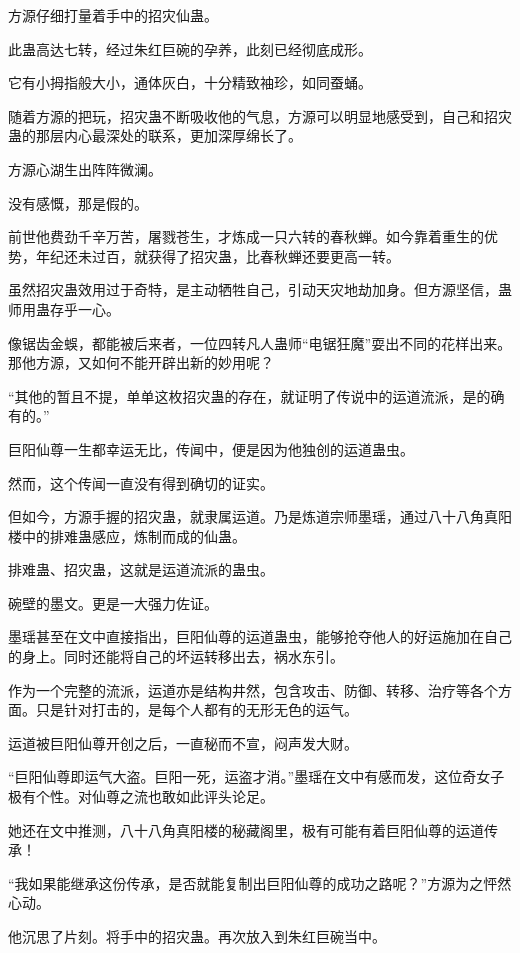 
\begin{this_body}

方源仔细打量着手中的招灾仙蛊。

此蛊高达七转，经过朱红巨碗的孕养，此刻已经彻底成形。

它有小拇指般大小，通体灰白，十分精致袖珍，如同蚕蛹。

随着方源的把玩，招灾蛊不断吸收他的气息，方源可以明显地感受到，自己和招灾蛊的那层内心最深处的联系，更加深厚绵长了。

方源心湖生出阵阵微澜。

没有感慨，那是假的。

前世他费劲千辛万苦，屠戮苍生，才炼成一只六转的春秋蝉。如今靠着重生的优势，年纪还未过百，就获得了招灾蛊，比春秋蝉还要更高一转。

虽然招灾蛊效用过于奇特，是主动牺牲自己，引动天灾地劫加身。但方源坚信，蛊师用蛊存乎一心。

像锯齿金蜈，都能被后来者，一位四转凡人蛊师“电锯狂魔”耍出不同的花样出来。那他方源，又如何不能开辟出新的妙用呢？

“其他的暂且不提，单单这枚招灾蛊的存在，就证明了传说中的运道流派，是的确有的。”

巨阳仙尊一生都幸运无比，传闻中，便是因为他独创的运道蛊虫。

然而，这个传闻一直没有得到确切的证实。

但如今，方源手握的招灾蛊，就隶属运道。乃是炼道宗师墨瑶，通过八十八角真阳楼中的排难蛊感应，炼制而成的仙蛊。

排难蛊、招灾蛊，这就是运道流派的蛊虫。

碗壁的墨文。更是一大强力佐证。

墨瑶甚至在文中直接指出，巨阳仙尊的运道蛊虫，能够抢夺他人的好运施加在自己的身上。同时还能将自己的坏运转移出去，祸水东引。

作为一个完整的流派，运道亦是结构井然，包含攻击、防御、转移、治疗等各个方面。只是针对打击的，是每个人都有的无形无色的运气。

运道被巨阳仙尊开创之后，一直秘而不宣，闷声发大财。

“巨阳仙尊即运气大盗。巨阳一死，运盗才消。”墨瑶在文中有感而发，这位奇女子极有个性。对仙尊之流也敢如此评头论足。

她还在文中推测，八十八角真阳楼的秘藏阁里，极有可能有着巨阳仙尊的运道传承！

“我如果能继承这份传承，是否就能复制出巨阳仙尊的成功之路呢？”方源为之怦然心动。

他沉思了片刻。将手中的招灾蛊。再次放入到朱红巨碗当中。


\end{this_body}
